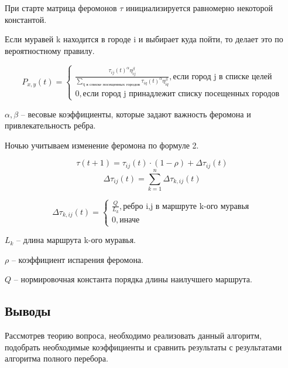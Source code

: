 \documentclass[a4paper,14pt]{article} %
\begin{document}
	При старте матрица феромонов $\tau$ инициализируется равномерно некоторой константой. 
	
	Если муравей k находится в городе i и выбирает куда пойти, то делает это по вероятностному правилу. 
	
	\begin{equation}
	P_{x,y}(t) =  
 	\begin{cases}
  		\frac{\tau_{ij}(t)^{\alpha} \eta_{ij}^{\beta}}{\sum_{\text{q в списке посещенных городов}} \tau_{iq}(t)^{\alpha} \eta_{iq}^{\beta}}, \text{если город j в списке целей}\\
   		0, \text{если город j принадлежит списку посещенных городов}
 	\end{cases}
	\end{equation}
	
	$\alpha, \beta$ -- весовые коэффициенты, которые задают важность феромона и привлекательность ребра. 
	
	Ночью учитываем изменение феромона по формуле 2. 
	
	\begin{equation} \tau (t+1)=\tau_{ij}(t)\cdot(1-\rho)+\Delta\tau_{ij}(t) \end{equation}
	\begin{equation} \Delta\tau_{ij}(t)=\sum_{k=1}^n\Delta \tau_{k,ij}(t) \end{equation}
	
	\begin{equation}
	\Delta \tau_{k,ij}(t) =  
 	\begin{cases}
  		\frac{Q}{L_k}, \text{ребро i,j в маршруте k-ого муравья}\\
   		0, \text{иначе}
 	\end{cases}
	\end{equation}
	
	$L_k$ -- длина маршрута k-ого муравья. 
	
	$\rho$ -- коэффициент испарения феромона. 
	
	$Q$ -- нормировочная константа порядка длины наилучшего маршрута. 
	
        \subsection{Выводы} 
        \hfill
        
        Рассмотрев теорию вопроса, необходимо реализовать данный алгоритм, подобрать необходимые коэффициенты и сравнить результаты с результатами алгоритма полного перебора. 
        
\end{document}
